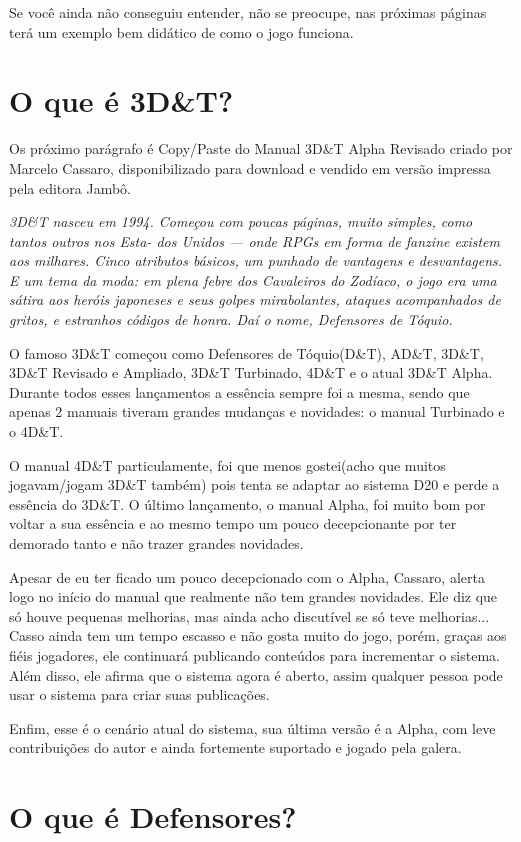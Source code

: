 Se você ainda não conseguiu entender, não se preocupe, nas próximas páginas terá um exemplo bem didático de como o jogo funciona.

\section{O que é 3D\&T?}

Os próximo parágrafo é Copy/Paste do Manual 3D\&T Alpha Revisado criado por Marcelo Cassaro, disponibilizado para download e vendido em versão impressa pela editora Jambô. 

\textsl{ 3D\&T nasceu em 1994. Começou com poucas páginas, muito simples, como tantos outros nos Esta-
dos Unidos — onde RPGs em forma de fanzine existem aos milhares. Cinco atributos básicos, um punhado de vantagens e desvantagens. E um tema da moda: em plena febre dos Cavaleiros do Zodíaco, o jogo era uma
sátira aos heróis japoneses e seus golpes mirabolantes, ataques acompanhados de gritos, e estranhos códigos de honra. Daí o nome, Defensores de Tóquio.
}

O famoso 3D\&T começou como Defensores de Tóquio(D\&T), AD\&T, 3D\&T, 3D\&T Revisado e Ampliado, 3D\&T Turbinado, 4D\&T e o atual 3D\&T Alpha. Durante todos esses lançamentos a essência sempre foi a mesma, sendo que apenas 2 manuais tiveram grandes mudanças e novidades: o manual Turbinado e o 4D\&T. 

O manual 4D\&T particulamente, foi que menos gostei(acho que muitos jogavam/jogam 3D\&T também) pois tenta se adaptar ao sistema D20 e perde a essência do 3D\&T. O último lançamento, o manual Alpha, foi muito bom por voltar a sua essência e ao mesmo tempo um pouco decepcionante por ter demorado tanto e não trazer grandes novidades.

Apesar de eu ter ficado um pouco decepcionado com o Alpha, Cassaro, alerta logo no início do manual que realmente não tem grandes novidades. Ele diz que só houve pequenas melhorias, mas ainda acho discutível se só teve melhorias... Casso ainda tem um tempo escasso e não gosta muito do jogo, porém, graças aos fiéis jogadores, ele continuará publicando conteúdos para incrementar o sistema. Além disso, ele afirma que o sistema agora é aberto, assim qualquer pessoa pode usar o sistema para criar suas publicações.

Enfim, esse é o cenário atual do sistema, sua última versão é a Alpha, com leve contribuições do autor e ainda fortemente suportado e jogado pela galera.

\section{O que é Defensores?}

